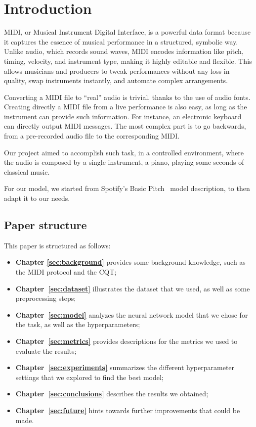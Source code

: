 \documentclass[10pt,twocolumn,letterpaper]{article}
\begin{document}
\section{Introduction}\label{sec:intro}
MIDI, or Musical Instrument Digital Interface, is a powerful data format because it captures the essence of musical performance in a structured, symbolic way.
Unlike audio, which records sound waves, MIDI encodes information like pitch, timing, velocity, and instrument type, making it highly editable and flexible.
This allows musicians and producers to tweak performances without any loss in quality, swap instruments instantly, and automate complex arrangements.

Converting a MIDI file to ``real'' audio is trivial, thanks to the use of audio fonts.
Creating directly a MIDI file from a live performance is also easy, as long as the instrument can provide such information. For instance, an electronic keyboard can directly output MIDI messages.
The most complex part is to go backwards, from a pre-recorded audio file to the corresponding MIDI.

Our project aimed to accomplish such task, in a controlled environment, where the audio is composed by a single instrument, a piano, playing some seconds of classical music.

For our model, we started from Spotify's Basic Pitch~\cite{spoty-audio} model description, to then adapt it to our needs.

\subsection{Paper structure}

This paper is structured as follows:
\begin{itemize}
    \item \textbf{Chapter \ref{sec:background}} provides some background knowledge, such as the MIDI protocol and the CQT;
    \item \textbf{Chapter~\ref{sec:dataset}} illustrates the dataset that we used, as well as some preprocessing steps;
    \item \textbf{Chapter~\ref{sec:model}} analyzes the neural network model that we chose for the task, as well as the hyperparameters;
    \item \textbf{Chapter~\ref{sec:metrics}} provides descriptions for the metrics we used to evaluate the results;
    \item \textbf{Chapter~\ref{sec:experiments}} summarizes the different hyperparameter settings that we explored to find the best model;
    \item \textbf{Chapter~\ref{sec:conclusions}} describes the results we obtained;
    \item \textbf{Chapter~\ref{sec:future}} hints towards further improvements that could be made.
\end{itemize}
\end{document}
